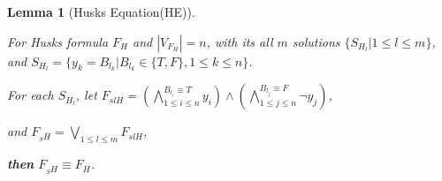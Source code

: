\documentclass[conference]{IEEEtran}
\newtheorem{lemma}{\textbf{Lemma}}
\begin{document}
% 
% 
% 
% 

\begin{lemma}[Husks Equation(HE)]\label{HE}

For Husks formula ${F_H}$ and $|V_{F_H}|= n$,
with its all $m$ solutions $\{S_{H_l}|1\leqslant l\leqslant m\}$,
and $S_{H_l}=\{y_k=B_{l_k}|B_{l_k} \in \{T,F\}, 1\leqslant k\leqslant n\}$.

For each $S_{H_l}$, let $F_{slH}=
(\bigwedge_{1\leqslant i\leqslant n}^{B_{l_i}\equiv T}y_{i})\wedge 
(\bigwedge_{1\leqslant j\leqslant n}^{B_{l_j}\equiv F}\neg y_{j})$,

and $F_{_SH}=\bigvee_{1\leqslant l\leqslant m}F_{slH}$,

\textbf{then}  $F_{_SH} \equiv F_H $.
\end{lemma}
\end{document}
